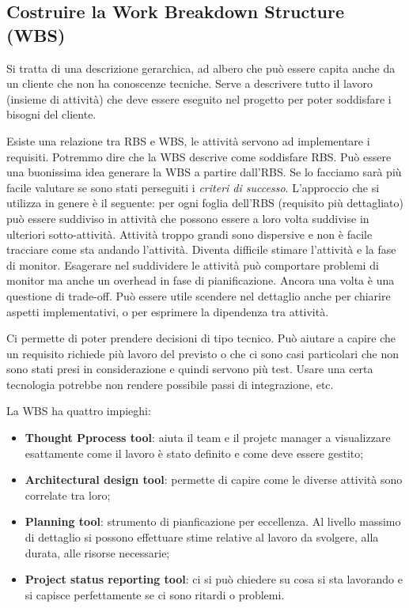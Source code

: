 \subsection{Costruire la Work Breakdown Structure (WBS)}
Si tratta di una descrizione gerarchica, ad albero che può essere capita anche da un cliente che non ha conoscenze tecniche. 
Serve a descrivere tutto il lavoro (insieme di attività) che deve essere eseguito nel progetto per poter soddisfare i bisogni del cliente.

\noindent Esiste una relazione tra RBS e WBS, le attività servono ad implementare i requisiti. Potremmo dire che la WBS descrive come soddisfare RBS.\noindent 
Può essere una buonissima idea generare la WBS a partire dall'RBS. Se lo facciamo sarà più facile valutare se sono stati perseguiti i \textit{criteri di successo}.\newline
\noindent L'approccio che si utilizza in genere è il seguente: per ogni foglia dell'RBS (requisito più dettagliato) può essere suddiviso in attività che possono essere a loro volta suddivise in ulteriori sotto-attività. Attività troppo grandi sono dispersive e non è facile tracciare come sta andando l'attività. Diventa difficile stimare l'attività e la fase di monitor.\newline
Esagerare nel suddividere le attività può comportare problemi di monitor ma anche un overhead in fase di pianificazione. Ancora una volta è una questione di trade-off. Può essere utile scendere nel dettaglio anche per chiarire aspetti implementativi, o per esprimere la dipendenza tra attività.

\begin{info}
	Ci permette di poter prendere decisioni di tipo tecnico. Può aiutare a capire che un requisito richiede più lavoro del previsto o che ci sono casi particolari che non sono stati presi in considerazione e quindi servono più test. Usare una certa tecnologia potrebbe non rendere possibile passi di integrazione, etc.
\end{info}

La WBS ha quattro impieghi:
\begin{itemize}
	\item \textbf{Thought Pprocess tool}: aiuta il team e il projetc manager a visualizzare esattamente come il lavoro è stato definito e come deve essere gestito;
	\item \textbf{Architectural design tool}: permette di capire come le diverse attività sono correlate tra loro;
	\item \textbf{Planning tool}: strumento di pianficazione per eccellenza. Al livello massimo di dettaglio si possono effettuare stime relative al lavoro da svolgere, alla durata, alle risorse necessarie;
	\item \textbf{Project status reporting tool}: ci si può chiedere su cosa si sta lavorando e si capisce perfettamente se ci sono ritardi o problemi.
\end{itemize}

